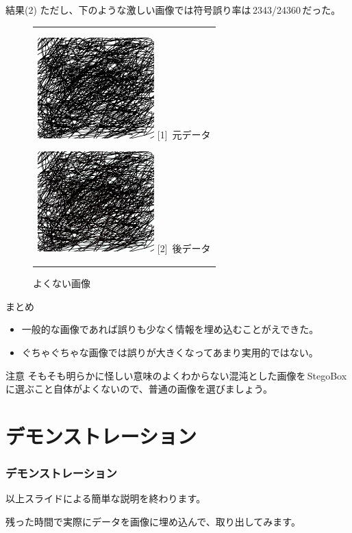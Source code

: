 \documentclass[dvipdfmx,11pt,notheorems]{beamer}
\theoremstyle{definition}
\begin{document}
\begin{frame}{結果(2)}
	ただし、下のような激しい画像では符号誤り率は\,2343/24360\,だった。

	\begin{figure}[htbp]
		\begin{center}
			\begin{tabular}{c}

				\begin{minipage}{0.5\hsize}
					\begin{center}
						\includegraphics[clip, width=4.5cm]{Test.png}
						\hspace{1.6cm} [1]\ 元データ
					\end{center}
				\end{minipage}

				\begin{minipage}{0.5\hsize}
					\begin{center}
						\includegraphics[clip, width=4.5cm]{StegoTest.png}
						\hspace{1.6cm} [2]\ 後データ
					\end{center}
				\end{minipage}
			\end{tabular}
			\caption{よくない画像}
			\label{fig:test}
		\end{center}
	\end{figure}
\end{frame}

\begin{frame}{まとめ}
	\begin{itemize}
		\item 一般的な画像であれば誤りも少なく情報を埋め込むことがえできた。
		\item ぐちゃぐちゃな画像では誤りが大きくなってあまり実用的ではない。
	\end{itemize}
	\begin{alertblock}{注意}
		そもそも明らかに怪しい意味のよくわからない混沌とした画像を\,StegoBox\,
		に選ぶこと自体がよくないので、普通の画像を選びましょう。
	\end{alertblock}
\end{frame}

\section{デモンストレーション}
\begin{frame}\frametitle{デモンストレーション}
	以上スライドによる簡単な説明を終わります。

	残った時間で実際にデータを画像に埋め込んで、取り出してみます。
\end{frame}
\end{document}
